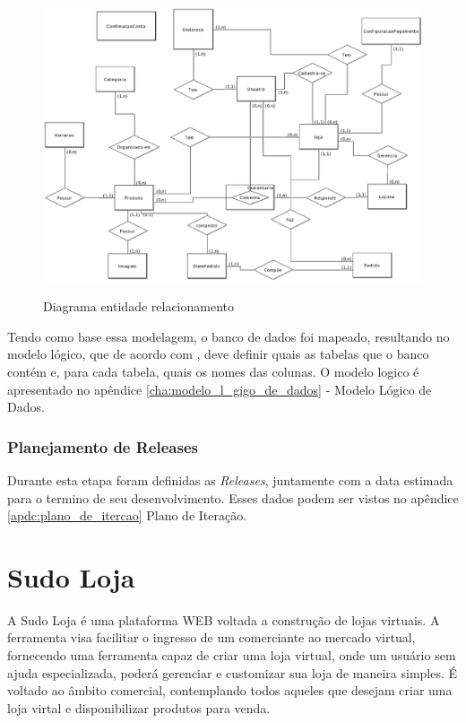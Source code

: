 \documentclass[a4paper,12pt]{monografia}
\begin{document}
\begin{figure}[H]
\centering
\caption{Diagrama entidade relacionamento}
\centering
\includegraphics[width=15cm]{img/diagramas/der.eps}\\
\label{fig:der}
\end{figure}

Tendo como base essa modelagem, o banco de dados foi mapeado, resultando no modelo lógico, que de acordo com , deve definir quais as tabelas que o banco contém e, para cada tabela, quais os nomes das colunas. O modelo logico é apresentado no apêndice \ref{cha:modelo_l_gigo_de_dados} - Modelo Lógico de Dados.

\subsection{Planejamento de Releases} %
\label{sub:planejamento_de_releases}

Durante esta etapa foram definidas as \textit{Releases}, juntamente com a data estimada para o termino de seu desenvolvimento. Esses dados podem ser vistos no apêndice \ref{apdc:plano_de_itercao} Plano de Iteração.



\chapter{Sudo Loja} %
\label{cha:sudoloja}

A Sudo Loja é uma plataforma WEB voltada a construção de lojas virtuais. A ferramenta visa facilitar o ingresso de um comerciante ao mercado virtual, fornecendo uma ferramenta capaz de criar uma loja virtual, onde um usuário sem ajuda especializada, poderá gerenciar e customizar sua loja de maneira simples. É voltado ao âmbito comercial, contemplando todos aqueles que desejam criar uma loja virtal e disponibilizar produtos para venda.
\end{document}
